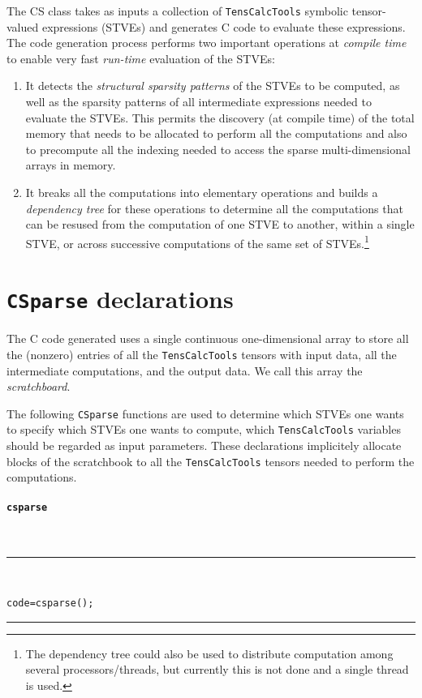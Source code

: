 \documentclass[11pt]{article}
\newcommand{\TC}{\texttt{TensCalcTools}}
\newcommand{\CS}{\texttt{CSparse}}
\newcommand{\codesize}{\footnotesize}
\newcommand{\toidx}[1]{\index{\lstinline{#1}}}%
\newenvironment{command}[1]{\toidx{#1}\addcontentsline{toc}{subsection}{\lstinline{#1}}\paragraph*{\lstinline[basicstyle=\large,columns={[l]flexible}]{#1}}~\\\noindent\rule{\textwidth}{2pt}\\\vspace{-3ex}\codesize}{\vspace{-3ex}\rule{\textwidth}{1pt}\medskip\noindent}
\begin{document}
The CS{} class takes as inputs a collection of \TC{} symbolic
tensor-valued expressions (STVEs) and generates C code to evaluate
these expressions. The code generation process performs two important
operations at \emph{compile time} to enable very fast \emph{run-time}
evaluation of the STVEs:
\begin{enumerate}
\item It detects the \emph{structural sparsity patterns} of the STVEs
  to be computed, as well as the sparsity patterns of all intermediate
  expressions needed to evaluate the STVEs. This permits the discovery
  (at compile time) of the total memory that needs to be allocated to
  perform all the computations and also to precompute all the indexing
  needed to access the sparse multi-dimensional arrays in memory.

\item It breaks all the computations into elementary operations and
  builds a \emph{dependency tree} for these operations to determine
  all the computations that can be resused from the computation of one
  STVE to another, within a single STVE, or across successive
  computations of the same set of STVEs.\footnote{The dependency tree
    could also be used to distribute computation among several
    processors/threads, but currently this is not done and a single
    thread is used.}
\end{enumerate}

\section{\CS{} declarations}

The C code generated uses a single continuous one-dimensional array to
store all the (nonzero) entries of all the \TC{} tensors with input
data, all the intermediate computations, and the output data. We call
this array the \emph{scratchboard}.

\medskip

The following \CS{} functions are used to determine which STVEs one
wants to specify which STVEs one wants to compute, which \TC{}
variables should be regarded as input parameters. These declarations
implicitely allocate blocks of the scratchbook to all the \TC{}
tensors needed to perform the computations.

\begin{command}{csparse}
\begin{lstlisting}
code=csparse();
\end{lstlisting}
\end{command}
\end{document}

